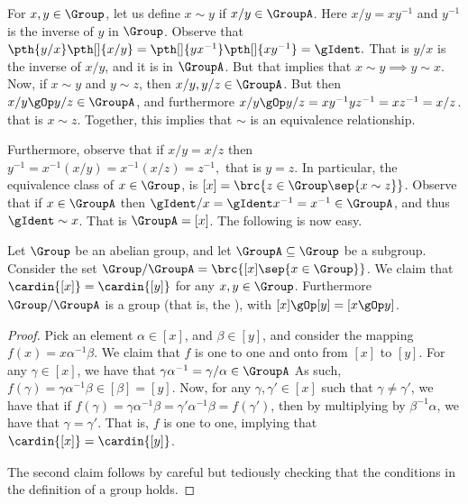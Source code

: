 For $x, y \in \Group$, let us define $x \sim y$ if $x/y \in
\GroupA$. Here $x/y = x y^{-1}$ and $y^{-1}$ is the inverse of $y$ in
$\Group$. Observe that 
\begin{math}
    \pth{y/x}\pth[]{x/y} = \pth[]{yx^{-1}} \pth[]{xy^{-1}} = \gIdent.
\end{math}
That is $y/x$ is the inverse of $x/y$, and it is in $\GroupA$. But
that implies that $x \sim y \implies y \sim x$. Now, if $x \sim y$ and
$y \sim z$, then $x/y, y/z \in \GroupA$. But then $x/y \gOp y/z \in
\GroupA$, and furthermore $x/y \gOp y/z = x y^{-1} y z^{-1} = x z^{-1}
= x/z$. that is $x \sim z$. Together, this implies that $\sim$ is an
equivalence relationship.

Furthermore, observe that if $x/y = x/z$ then 
\begin{math}
    y^{-1} = x^{-1} (x/y) = 
    x^{-1} (x/z) = z^{-1},
\end{math}
that is $y=z$. In particular, the equivalence class of $x \in \Group$,
is $[x] = \brc{z \in \Group \sep{x \sim z}}$. Observe that if $x \in
\GroupA$ then $\gIdent / x = \gIdent x^{-1} = x^{-1} \in \GroupA$, and
thus $\gIdent \sim x$. That is $\GroupA = [x]$. The following is now
easy.

\begin{lemma}
    Let $\Group$ be an abelian group, and let $\GroupA \subseteq
    \Group$ be a subgroup.  Consider the set $\Group / \GroupA = \brc{
       [x] \sep{ x \in \Group}}$. We claim that $\cardin{\bigl. [x]} =
    \cardin{\bigl. [y]}$ for any $x,y \in \Group$.  Furthermore
    $\Group/ \GroupA$ is a group (that is, the ), with $[x] \gOp [y] = [x \gOp y]$.
\end{lemma}
\begin{proof}
    Pick an element $\alpha \in [x]$, and $\beta \in [y]$, and
    consider the mapping $f(x) = x \alpha^{-1} \beta$. We claim that
    $f$ is one to one and onto from $[x]$ to $[y]$.  For any $\gamma
    \in [x]$, we have that $\gamma\alpha^{-1} =\gamma/\alpha \in
    \GroupA$ As such, $f(\gamma ) = \gamma \alpha^{-1} \beta \in
    [\beta] = [y]$. Now, for any $\gamma, \gamma' \in [x]$ such that
    $\gamma \neq \gamma'$, we have that if $f(\gamma)
    =\gamma\alpha^{-1} \beta = \gamma'\alpha^{-1} \beta = f(\gamma')$,
    then by multiplying by $\beta^{-1} \alpha$, we have that $\gamma =
    \gamma'$. That is, $f$ is one to one, implying that
    $\cardin{\bigl. [x]} = \cardin{\bigl. [y]}$.

    The second claim follows by careful but tediously checking that
    the conditions in the definition of a group holds.
\end{proof}

